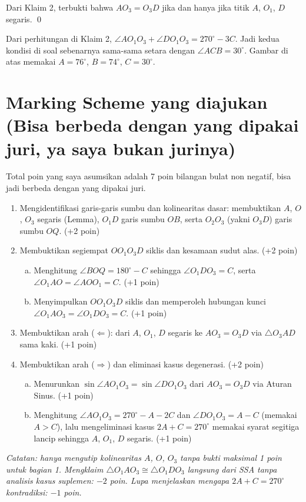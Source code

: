 Dari Klaim 2, terbukti bahwa $AO_3 = O_3D$ jika dan hanya jika titik $A$, $O_1$, $D$ segaris. \qed

\begin{remark*}
    Dari perhitungan di Klaim 2, $\angle AO_1O_3 + \angle DO_1O_3 = 270^\circ - 3C$. Jadi kedua kondisi di soal sebenarnya sama-sama setara dengan $\angle ACB = 30^\circ$. Gambar di atas memakai $A = 76^\circ$, $B = 74^\circ$, $C = 30^\circ$.
\end{remark*}

\newpage
\section{Marking Scheme yang diajukan (Bisa berbeda dengan yang dipakai juri, ya saya bukan jurinya)}
Total poin yang saya asumsikan adalah 7 poin bilangan bulat non negatif, bisa jadi berbeda dengan yang dipakai juri.
\begin{enumerate}[1)]
    \item Mengidentifikasi garis-garis sumbu dan kolinearitas dasar: membuktikan $A$, $O$, $O_3$ segaris (Lemma), $O_1D$ garis sumbu $OB$, serta $O_2O_3$ (yakni $O_3D$) garis sumbu $OQ$. (+2 poin)
    \item Membuktikan segiempat $OO_1O_3D$ siklis dan kesamaan sudut alas. (+2 poin)
    \begin{enumerate}[(a)]
        \item Menghitung $\angle BOQ = 180^\circ - C$ sehingga $\angle O_1DO_3 = C$, serta $\angle O_1AO = \angle AOO_1 = C$. (+1 poin)
        \item Menyimpulkan $OO_1O_3D$ siklis dan memperoleh hubungan kunci $\angle O_1AO_3 = \angle O_1DO_3 = C$. (+1 poin)
    \end{enumerate}
    \item Membuktikan arah ($\Leftarrow$): dari $A$, $O_1$, $D$ segaris ke $AO_3 = O_3D$ via $\triangle O_3AD$ sama kaki. (+1 poin)
    \item Membuktikan arah ($\Rightarrow$) dan eliminasi kasus degenerasi. (+2 poin)
    \begin{enumerate}[(a)]
        \item Menurunkan $\sin\angle AO_1O_3 = \sin\angle DO_1O_3$ dari $AO_3 = O_3D$ via Aturan Sinus. (+1 poin)
        \item Menghitung $\angle AO_1O_3 = 270^\circ - A - 2C$ dan $\angle DO_1O_3 = A - C$ (memakai $A > C$), lalu mengeliminasi kasus $2A + C = 270^\circ$ memakai syarat segitiga lancip sehingga $A$, $O_1$, $D$ segaris. (+1 poin)
    \end{enumerate}
\end{enumerate}

\textit{Catatan: hanya mengutip kolinearitas $A$, $O$, $O_3$ tanpa bukti maksimal 1 poin untuk bagian 1. Mengklaim $\triangle O_1AO_3 \cong \triangle O_1DO_3$ langsung dari SSA tanpa analisis kasus suplemen: $-2$ poin. Lupa menjelaskan mengapa $2A + C = 270^\circ$ kontradiksi: $-1$ poin.}
